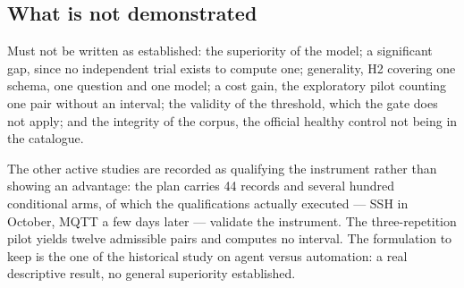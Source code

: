 \subsection{What is not demonstrated}

Must not be written as established: the superiority of the model; a significant
gap, since no independent trial exists to compute one; generality, H2 covering one
schema, one question and one model; a cost gain, the exploratory pilot counting one
pair without an interval; the validity of the threshold, which the gate does not
apply; and the integrity of the corpus, the official healthy control not being in
the catalogue.

The other active studies are recorded as qualifying the instrument rather than
showing an advantage: the plan carries 44 records and several hundred conditional
arms, of which the qualifications actually executed --- SSH in October, MQTT a few
days later --- validate the instrument. The three-repetition pilot yields twelve
admissible pairs and computes no interval. The formulation to keep is the one of the
historical study on agent versus automation: a real descriptive result, no general
superiority established.
